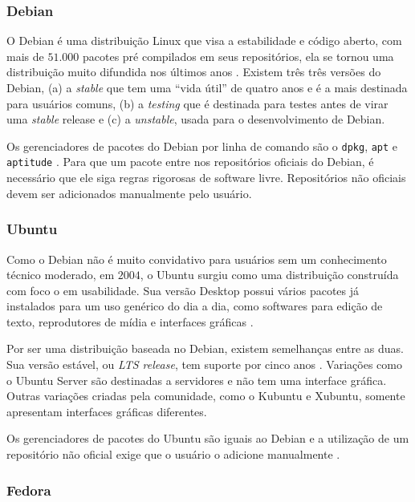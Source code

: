\documentclass[
article,			%
12pt,				%
openright,			%
oneside,			%
a4paper,			%
chapter=TITLE,		%
section=TITLE,		%
subsection=TITLE,	%
subsubsection=TITLE,%
subsubsubsection=TITLE, %
english,			%
brazil,				%
]{abntex2}
\def\code#1{\texttt{#1}}
\begin{document}
\subsubsection{Debian}

O Debian é uma distribuição Linux que visa a estabilidade e código
aberto, com mais de $51.000$ pacotes pré compilados em seus
repositórios, ela se tornou uma distribuição muito difundida nos
últimos anos \cite{Debian2018}. Existem três três versões do Debian,
(a) a \emph{stable} que tem uma ``vida útil'' de quatro anos e é a
mais destinada para usuários comuns, (b) a \emph{testing} que é
destinada para testes antes de virar uma \emph{stable} release e (c) a
\emph{unstable}, usada para o desenvolvimento de Debian.

Os gerenciadores de pacotes do Debian por linha de comando são o
\code{dpkg}, \code{apt} e \code{aptitude} \cite{Debian2016}. Para que
um pacote entre nos repositórios oficiais do Debian, é necessário que
ele siga regras rigorosas de software livre. Repositórios não oficiais
devem ser adicionados manualmente pelo usuário.

\subsubsection{Ubuntu}

Como o Debian não é muito convidativo para usuários sem um
conhecimento técnico moderado, em $2004$, o Ubuntu surgiu como uma
distribuição construída com foco o em usabilidade. Sua versão Desktop
possui vários pacotes já instalados para um uso genérico do dia a dia,
como softwares para edição de texto, reprodutores de mídia e
interfaces gráficas \cite{UbuntuFundation2018}.

Por ser uma distribuição baseada no Debian, existem semelhanças entre
as duas. Sua versão estável, ou \emph{LTS release}, tem suporte por
cinco anos \cite{UbuntuWiki2017}. Variações como o Ubuntu Server são
destinadas a servidores e não tem uma interface gráfica. Outras
variações criadas pela comunidade, como o Kubuntu e Xubuntu, somente
apresentam interfaces gráficas diferentes.

Os gerenciadores de pacotes do Ubuntu são iguais ao Debian e a
utilização de um repositório não oficial exige que o usuário o
adicione manualmente \cite{UbuntuWiki2018}.

\subsubsection{Fedora}
\end{document}
